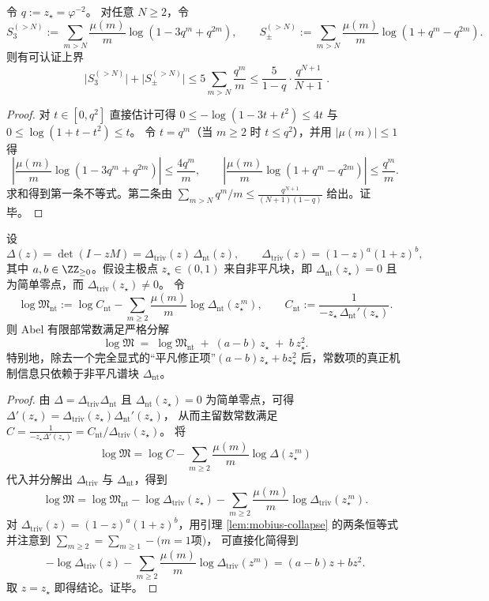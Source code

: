 \begin{corollary}[二核级数的可认证尾界]\label{cor:real-input-40-mertens-two-series-tail}
令 \(q:=z_\star=\varphi^{-2}\)。
对任意 \(N\ge 2\)，令
\[
S_3^{(>N)}:=\sum_{m>N}\frac{\mu(m)}{m}\log(1-3q^m+q^{2m}),
\qquad
S_\pm^{(>N)}:=\sum_{m>N}\frac{\mu(m)}{m}\log(1+q^m-q^{2m}).
\]
则有可认证上界
\[
\boxed{\;
\bigl|S_3^{(>N)}\bigr|+\bigl|S_\pm^{(>N)}\bigr|
\le
5\sum_{m>N}\frac{q^m}{m}
\le
\frac{5}{1-q}\cdot\frac{q^{N+1}}{N+1}\; }.
\]
\end{corollary}
\begin{proof}
对 \(t\in[0,q^2]\) 直接估计可得
\(
0\le -\log(1-3t+t^2)\le 4t
\)
与
\(
0\le \log(1+t-t^2)\le t
\)。
令 \(t=q^m\)（当 \(m\ge 2\) 时 \(t\le q^2\)），并用 \(|\mu(m)|\le 1\) 得
\[
\left|\frac{\mu(m)}{m}\log(1-3q^m+q^{2m})\right|\le \frac{4q^m}{m},\qquad
\left|\frac{\mu(m)}{m}\log(1+q^m-q^{2m})\right|\le \frac{q^m}{m}.
\]
求和得到第一条不等式。第二条由
\(
\sum_{m>N}q^m/m\le \frac{q^{N+1}}{(N+1)(1-q)}
\)
给出。证毕。
\end{proof}

\begin{proposition}\label{prop:real-input-40-reduced-mertens}
设
\[
\Delta(z)=\det(I-zM)=\Delta_{\mathrm{triv}}(z)\,\Delta_{\mathrm{nt}}(z),
\qquad
\Delta_{\mathrm{triv}}(z)=(1-z)^a(1+z)^b,
\]
其中 $a,b\in\ZZ_{\ge 0}$。假设主极点 $z_\star\in(0,1)$ 来自非平凡块，即 $\Delta_{\mathrm{nt}}(z_\star)=0$ 且为简单零点，而 $\Delta_{\mathrm{triv}}(z_\star)\neq 0$。
令
\[
\log\mathfrak{M}_{\mathrm{nt}}
:=\log C_{\mathrm{nt}}-\sum_{m\ge 2}\frac{\mu(m)}{m}\log \Delta_{\mathrm{nt}}(z_\star^{\,m}),
\qquad
C_{\mathrm{nt}}:=\frac{1}{-z_\star\,\Delta_{\mathrm{nt}}'(z_\star)}.
\]
则 Abel 有限部常数满足严格分解
\[
\boxed{\;
\log\mathfrak{M}
\;=\;
\log\mathfrak{M}_{\mathrm{nt}}
\;+\;
(a-b)\,z_\star
\;+\;
b\,z_\star^2.
\;}
\]
特别地，除去一个完全显式的“平凡修正项”\((a-b)z_\star+bz_\star^2\) 后，常数项的真正机制信息只依赖于非平凡谱块 $\Delta_{\mathrm{nt}}$。
\end{proposition}
\begin{proof}
由 $\Delta=\Delta_{\mathrm{triv}}\Delta_{\mathrm{nt}}$ 且 $\Delta_{\mathrm{nt}}(z_\star)=0$ 为简单零点，可得
\(
\Delta'(z_\star)=\Delta_{\mathrm{triv}}(z_\star)\Delta_{\mathrm{nt}}'(z_\star)
\)，
从而主留数常数满足
\(
C=\frac{1}{-z_\star\Delta'(z_\star)}=C_{\mathrm{nt}}/\Delta_{\mathrm{triv}}(z_\star)
\)。
将
\[
\log\mathfrak{M}=\log C-\sum_{m\ge 2}\frac{\mu(m)}{m}\log\Delta(z_\star^{\,m})
\]
代入并分解出 $\Delta_{\mathrm{triv}}$ 与 $\Delta_{\mathrm{nt}}$，得到
\[
\log\mathfrak{M}
=\log\mathfrak{M}_{\mathrm{nt}}
-\log\Delta_{\mathrm{triv}}(z_\star)
-\sum_{m\ge 2}\frac{\mu(m)}{m}\log\Delta_{\mathrm{triv}}(z_\star^{\,m}).
\]
对 $\Delta_{\mathrm{triv}}(z)=(1-z)^a(1+z)^b$，用引理 \ref{lem:mobius-collapse} 的两条恒等式并注意到
\(
\sum_{m\ge 2}=\sum_{m\ge 1}-\text{(}m=1\text{项)}
\)，
可直接化简得到
\[
-\log\Delta_{\mathrm{triv}}(z)-\sum_{m\ge 2}\frac{\mu(m)}{m}\log\Delta_{\mathrm{triv}}(z^{m})
=(a-b)z+bz^2.
\]
取 $z=z_\star$ 即得结论。证毕。
\end{proof}

